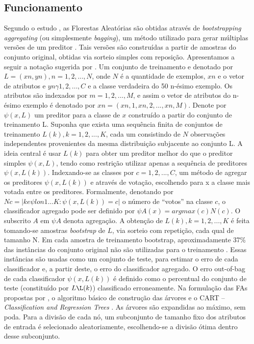 \subsection{Funcionamento}

Segundo o estudo \cite{bastos2013proposta}, as Florestas Aleatórias são obtidas através de \textit{bootstrapping aggregating} (ou simplesmente \textit{bagging}), um método utilizado para gerar múltiplas versões de um preditor \cite{breiman1996bagging}. Tais versões são construídas a partir de amostras do conjunto original, obtidas via sorteio simples com reposição. Apresentamos a seguir a notação sugerida por \cite{breiman2001random}. Um conjunto de treinamento e denotado por $ L = {(xn, yn), n = 1, 2,...,N} $, onde $ N $  é a quantidade de exemplos, $ xn $ e o vetor de atributos e $ yn \gamma {1, 2,...,C} $ e a classe verdadeira do 50 n-ésimo exemplo. Os atributos são indexados por $ m = 1, 2,...,M $, e assim o vetor de atributos do n-ésimo exemplo é denotado por  $ xn = (xn,1, xn,2,...,xn,M) $. Denote por $ \psi (x,L) $ um preditor para a classe de $ x $ construído a partir do conjunto de treinamento L. Suponha que exista uma sequência finita de conjuntos de treinamento $ {L(k) }, k = 1, 2,...,K $, cada um consistindo de $ N $ observações independentes provenientes da mesma distribuição subjacente ao conjunto L. A ideia central é usar $ {L(k) } $ para obter um preditor melhor do que o preditor simples $ \psi (x,L) $, tendo como restrição utilizar apenas a sequência de preditores $ \psi (x,L(k)) $. Indexando-se as classes por $ c = 1, 2,...,C $, um método de agregar os preditores $ \psi (x,L(k)) $ e através de votação, escolhendo para x a classe mais votada entre os preditores. Formalmente, denotando por $ Nc = |{k e\psi lon {1 ...K} : \psi (x,L(k) ) = c}| $ o número de “votos” na classe $ c $, o classificador agregado pode ser definido por $ \psi A(x) = arg max(c) N(c) $. O subscrito $ A $ em $ \psi A $ denota agregação. A obtenção de $ {L(k) }, k = 1, 2,...,K $ é feita tomando-se amostras \textit{bootstrap} de $ L $, via sorteio com repetição, cada qual de tamanho N. Em cada amostra de treinamento bootstrap, aproximadamente 37\% das instâncias do conjunto original  não são utilizadas para o treinamento \cite{breiman1996bagging}. Essas instâncias são usadas como um conjunto de teste, para estimar o erro de cada classificador e, a partir deste, o erro do classificador agregado. O erro out-of-bag de cada classificador $ \psi (x,L(k)) $ é definido como o percentual do conjunto de teste (constituído por $ L\L(k) $) classificado erroneamente. Na formulação das FAs propostas por \cite{breiman2001random}, o algoritmo básico de construção das árvores e o CART – \textit{Classification and Regression Trees} \cite{breiman2017classification}. As árvores são expandidas ao máximo, sem poda. Para a divisão de cada nó, um subconjunto de tamanho fixo dos atributos de entrada é selecionado aleatoriamente, escolhendo-se a divisão ótima dentro desse subconjunto.

